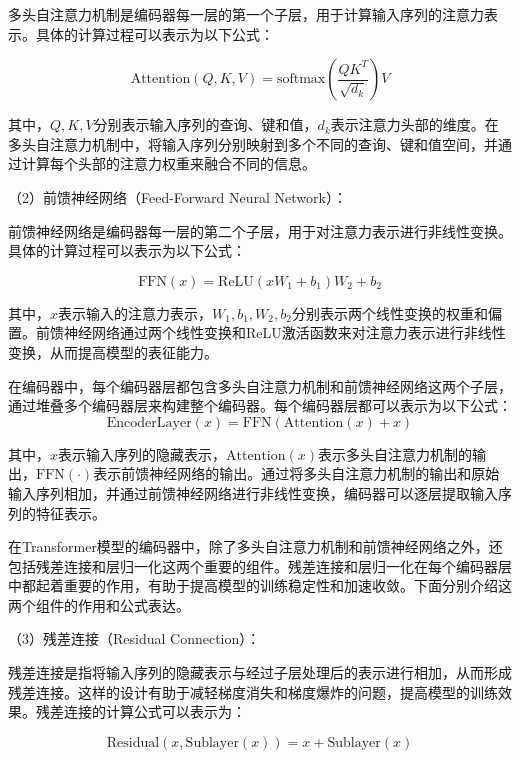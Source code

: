 多头自注意力机制是编码器每一层的第一个子层，用于计算输入序列的注意力表示。具体的计算过程可以表示为以下公式：

\begin{equation}
	\text{Attention}(Q, K, V) = \text{softmax}\left(\frac{QK^T}{\sqrt{d_k}}\right)V
\end{equation}

其中，$Q, K, V$分别表示输入序列的查询、键和值，$d_k$表示注意力头部的维度。在多头自注意力机制中，将输入序列分别映射到多个不同的查询、键和值空间，并通过计算每个头部的注意力权重来融合不同的信息。

（2）前馈神经网络（Feed-Forward Neural Network）：

前馈神经网络是编码器每一层的第二个子层，用于对注意力表示进行非线性变换。具体的计算过程可以表示为以下公式：

\begin{equation}
	\text{FFN}(x) = \text{ReLU}(xW_1 + b_1)W_2 + b_2
\end{equation}


其中，$x$表示输入的注意力表示，$W_1, b_1, W_2, b_2$分别表示两个线性变换的权重和偏置。前馈神经网络通过两个线性变换和ReLU激活函数来对注意力表示进行非线性变换，从而提高模型的表征能力。

在编码器中，每个编码器层都包含多头自注意力机制和前馈神经网络这两个子层，通过堆叠多个编码器层来构建整个编码器。每个编码器层都可以表示为以下公式：
\begin{equation}
	\text{EncoderLayer}(x) = \text{FFN}(\text{Attention}(x) + x)
\end{equation}

其中，$x$表示输入序列的隐藏表示，$\text{Attention}(x)$表示多头自注意力机制的输出，$\text{FFN}(\cdot)$表示前馈神经网络的输出。通过将多头自注意力机制的输出和原始输入序列相加，并通过前馈神经网络进行非线性变换，编码器可以逐层提取输入序列的特征表示。

在Transformer模型的编码器中，除了多头自注意力机制和前馈神经网络之外，还包括残差连接和层归一化这两个重要的组件。残差连接和层归一化在每个编码器层中都起着重要的作用，有助于提高模型的训练稳定性和加速收敛。下面分别介绍这两个组件的作用和公式表达。


（3）残差连接（Residual Connection）：

残差连接是指将输入序列的隐藏表示与经过子层处理后的表示进行相加，从而形成残差连接。这样的设计有助于减轻梯度消失和梯度爆炸的问题，提高模型的训练效果。残差连接的计算公式可以表示为：

\begin{equation}
	\text{Residual}(x, \text{Sublayer}(x)) = x + \text{Sublayer}(x)
\end{equation}


